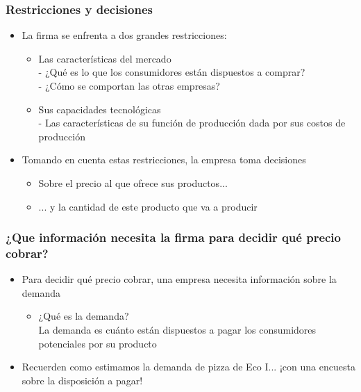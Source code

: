 \documentclass{beamer}
\begin{document}
\begin{frame}
\frametitle{Restricciones y decisiones}
\begin{itemize}
    \item La firma se enfrenta a dos grandes restricciones:
        \begin{itemize}
        \item Las características del mercado \\
        - ¿Qué es lo que los consumidores están dispuestos a comprar? \\
        - ¿Cómo se comportan las otras empresas?
        \item Sus capacidades tecnológicas \\
        - Las características de su función de producción dada por sus costos de producción
        \end{itemize}
    \item Tomando en cuenta estas restricciones, la empresa toma decisiones \\
    \begin{itemize}
        \item Sobre el precio al que ofrece sus productos...
        \item ... y la cantidad de este producto que va a producir
    \end{itemize}
\end{itemize} 
\end{frame}

\begin{frame}
\frametitle{¿Que información necesita la firma para decidir qué precio cobrar?}
\begin{itemize}
    \item Para decidir qué precio cobrar, una empresa necesita información sobre la demanda
    \begin{itemize}
        \item ¿Qué es la demanda? \\
    La demanda es cuánto están dispuestos a pagar los consumidores potenciales por su producto
    \end{itemize}
    \item Recuerden como estimamos la demanda de pizza de Eco I... ¡con una encuesta sobre la disposición a pagar!

\end{itemize}
\end{frame}
\end{document}
